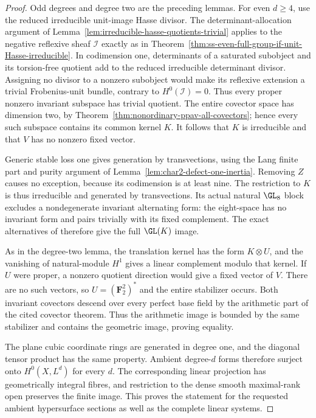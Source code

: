 \begin{proof}
Odd degrees and degree two are the preceding lemmas. For
even $d\ge4$, use the reduced irreducible unit-image Hasse
divisor. The determinant-allocation argument of
Lemma~\ref{lem:irreducible-hasse-quotients-trivial} applies
to the negative reflexive sheaf $\mathcal I$ exactly as in
Theorem~\ref{thm:ss-even-full-group-if-unit-Hasse-irreducible}.
In codimension one, determinants of a saturated subobject
and its torsion-free quotient add to the reduced irreducible
determinant divisor. Assigning no divisor to a nonzero
subobject would make its reflexive extension a trivial
Frobenius-unit bundle, contrary to $H^0(\mathcal I)=0$.
Thus every proper nonzero invariant subspace has trivial
quotient. The entire covector space has dimension two, by
Theorem~\ref{thm:nonordinary-ppav-all-covectors}; hence every
such subspace contains its common kernel $K$.
It follows that $K$ is irreducible and that $V$ has no
nonzero fixed vector.

Generic stable loss one gives generation by transvections,
using the Lang finite part and purity argument of
Lemma~\ref{lem:char2-defect-one-inertia}. Removing $Z$ causes
no exception, because its codimension is at least nine.
The restriction to $K$ is thus irreducible and generated
by transvections. Its actual natural $\GL_8$ block excludes
a nondegenerate invariant alternating form: the eight-space
has no invariant form and pairs trivially with its fixed
complement. The exact alternatives of
\cite[Theorem~3.6, printed p.~22]{KantorSeress2001}
therefore give the full $\GL(K)$ image.

As in the degree-two lemma, the translation kernel has the
form $K\otimes U$, and the vanishing of natural-module
$H^1$ gives a linear complement modulo that kernel.
If $U$ were proper, a nonzero quotient direction would
give a fixed vector of $V$. There are no such vectors,
so $U=(\mathbf F_2^2)^*$ and the entire stabilizer occurs.
Both invariant covectors descend over every perfect base
field by the arithmetic part of the cited covector theorem.
Thus the arithmetic image is bounded by the same stabilizer
and contains the geometric image, proving equality.

The plane cubic coordinate rings are generated in degree
one, and the diagonal tensor product has the same property.
Ambient degree-$d$ forms therefore surject onto $H^0(X,L^d)$
for every $d$. The corresponding linear projection has
geometrically integral fibres, and restriction to the dense
smooth maximal-rank open preserves the finite image.
This proves the statement for the requested ambient
hypersurface sections as well as the complete linear systems.
\end{proof}

